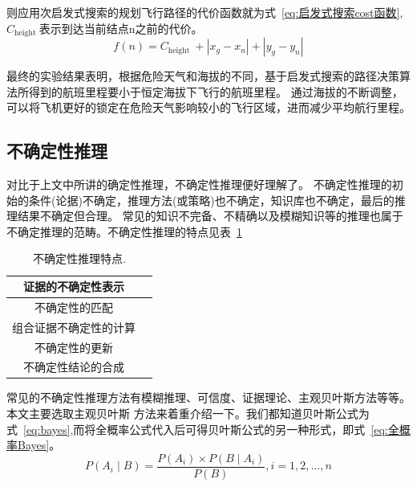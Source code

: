 \documentclass[12pt,a4paper,UTF8]{ctexart}
\begin{document}
则应用次启发式搜索的规划飞行路径的代价函数就为式~\ref{eq:启发式搜索cost函数},$ C_{\text {height }} $表示到达当前结点n之前的代价。
\begin{equation}
    f(n)=C_{\text {height }}+\left|x_g-x_n\right|+\left|y_g-y_n\right|
    \label{eq:启发式搜索cost函数}
\end{equation}

最终的实验结果表明，根据危险天气和海拔的不同，基于启发式搜索的路径决策算法所得到的航班里程要小于恒定海拔下飞行的航班里程。
通过海拔的不断调整，可以将飞机更好的锁定在危险天气影响较小的飞行区域，进而减少平均航行里程\cite{hePathPlanningMethod2019}。

\subsection{不确定性推理}
对比于上文中所讲的确定性推理，不确定性推理便好理解了。
不确定性推理的初始的条件(论据)不确定，推理方法(或策略)也不确定，知识库也不确定，最后的推理结果不确定但合理。
常见的知识不完备、不精确以及模糊知识等的推理也属于不确定推理的范畴。不确定性推理的特点见表~\ref{table:bqdx特点}
\begin{table}[htb]
    \centering
    \caption{不确定性推理特点.}
    \label{table:bqdx特点}
    \begin{tabular}{@{}cc@{}}
    \toprule
    证据的不确定性表示                       \\ \hline
    不确定性的匹配                         \\ \hline
    \multicolumn{1}{l}{组合证据不确定性的计算} \\ \hline
    不确定性的更新                         \\ \hline
    不确定性结论的合成                       \\ \hline
    \toprule
    \end{tabular}
\end{table}

常见的不确定性推理方法有模糊推理、可信度、证据理论、主观贝叶斯方法等等。本文主要选取主观贝叶斯
方法来着重介绍一下。我们都知道贝叶斯公式为式~\ref{eq:bayes},而将全概率公式代入后可得贝叶斯公式的另一种形式，即式~\ref{eq:全概率Bayes}。
\begin{equation}
    P\left(A_i \mid B\right)=\frac{P\left(A_i\right) \times P\left(B \mid A_i\right)}{P(B)}, i=1,2, \ldots, n
    \label{eq:bayes}
\end{equation}
\end{document}
